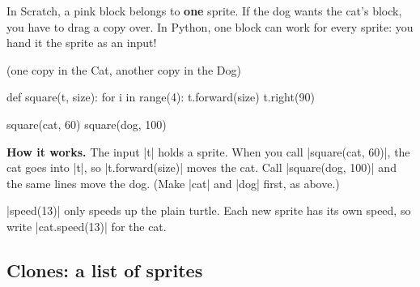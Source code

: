 In Scratch, a pink block belongs to \textbf{one} sprite. If the dog wants the cat's  block, you have to drag a copy over. In Python, one block can work for every sprite: you hand it the sprite as an input!

\begin{tcbraster}[raster columns=2, raster equal height=rows, raster column skip=12pt, raster valign=center, raster force size=false, raster column 1/.style={add to width=-2cm}, raster column 2/.style={add to width=2cm}]
\begin{tcolorbox}[colback=white, colframe=white, boxrule=0pt, valign=center]
\begin{scratch}
\end{scratch}
\par\smallskip
{\small (one copy in the Cat, another copy in the Dog)}
\end{tcolorbox}
\begin{code}
def square(t, size):
    for i in range(4):
        t.forward(size)
        t.right(90)

square(cat, 60)
square(dog, 100)
\end{code}
\end{tcbraster}

\textbf{How it works.} The input \py|t| holds a sprite. When you call \py|square(cat, 60)|, the cat goes into \py|t|, so \py|t.forward(size)| moves the cat. Call \py|square(dog, 100)| and the same lines move the dog. (Make \py|cat| and \py|dog| first, as above.)

\begin{think}
\py|speed(13)| only speeds up the plain turtle. Each new sprite has its own speed, so write \py|cat.speed(13)| for the cat.
\end{think}

\subsection*{Clones: a list of sprites}

